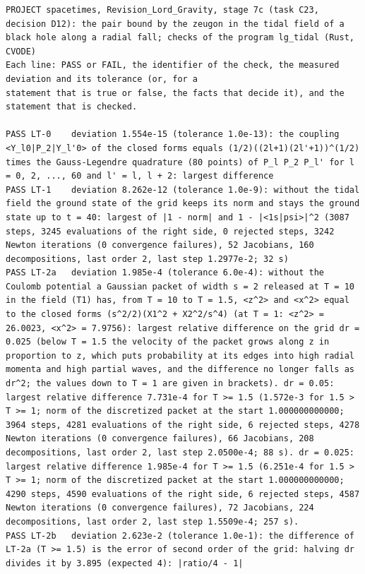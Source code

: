 \documentclass[
  10pt,
]{article}
\begin{document}
\begin{verbatim}
PROJECT spacetimes, Revision_Lord_Gravity, stage 7c (task C23, decision D12): the pair bound by the zeugon in the tidal field of a black hole along a radial fall; checks of the program lg_tidal (Rust, CVODE)
Each line: PASS or FAIL, the identifier of the check, the measured deviation and its tolerance (or, for a
statement that is true or false, the facts that decide it), and the statement that is checked.

PASS LT-0    deviation 1.554e-15 (tolerance 1.0e-13): the coupling <Y_l0|P_2|Y_l'0> of the closed forms equals (1/2)((2l+1)(2l'+1))^(1/2) times the Gauss-Legendre quadrature (80 points) of P_l P_2 P_l' for l = 0, 2, ..., 60 and l' = l, l + 2: largest difference
PASS LT-1    deviation 8.262e-12 (tolerance 1.0e-9): without the tidal field the ground state of the grid keeps its norm and stays the ground state up to t = 40: largest of |1 - norm| and 1 - |<1s|psi>|^2 (3087 steps, 3245 evaluations of the right side, 0 rejected steps, 3242 Newton iterations (0 convergence failures), 52 Jacobians, 160 decompositions, last order 2, last step 1.2977e-2; 32 s)
PASS LT-2a   deviation 1.985e-4 (tolerance 6.0e-4): without the Coulomb potential a Gaussian packet of width s = 2 released at T = 10 in the field (T1) has, from T = 10 to T = 1.5, <z^2> and <x^2> equal to the closed forms (s^2/2)(X1^2 + X2^2/s^4) (at T = 1: <z^2> = 26.0023, <x^2> = 7.9756): largest relative difference on the grid dr = 0.025 (below T = 1.5 the velocity of the packet grows along z in proportion to z, which puts probability at its edges into high radial momenta and high partial waves, and the difference no longer falls as dr^2; the values down to T = 1 are given in brackets). dr = 0.05: largest relative difference 7.731e-4 for T >= 1.5 (1.572e-3 for 1.5 > T >= 1; norm of the discretized packet at the start 1.000000000000; 3964 steps, 4281 evaluations of the right side, 6 rejected steps, 4278 Newton iterations (0 convergence failures), 66 Jacobians, 208 decompositions, last order 2, last step 2.0500e-4; 88 s). dr = 0.025: largest relative difference 1.985e-4 for T >= 1.5 (6.251e-4 for 1.5 > T >= 1; norm of the discretized packet at the start 1.000000000000; 4290 steps, 4590 evaluations of the right side, 6 rejected steps, 4587 Newton iterations (0 convergence failures), 72 Jacobians, 224 decompositions, last order 2, last step 1.5509e-4; 257 s). 
PASS LT-2b   deviation 2.623e-2 (tolerance 1.0e-1): the difference of LT-2a (T >= 1.5) is the error of second order of the grid: halving dr divides it by 3.895 (expected 4): |ratio/4 - 1|

\end{verbatim}
\end{document}
